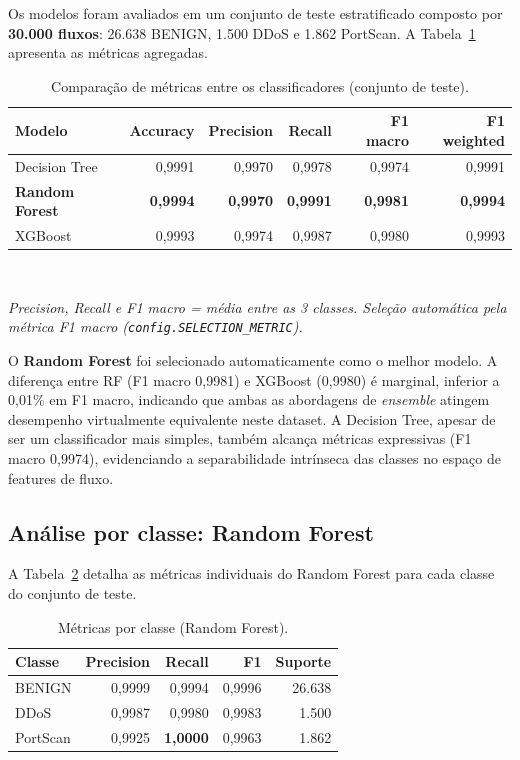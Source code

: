 \documentclass[12pt,a4paper]{article}
\begin{document}
Os modelos foram avaliados em um conjunto de teste estratificado composto
por \textbf{30.000 fluxos}: 26.638 BENIGN, 1.500 DDoS e 1.862 PortScan.
A Tabela~\ref{tab:metricas} apresenta as métricas agregadas.

\begin{table}[ht]
  \centering
  \caption{Comparação de métricas entre os classificadores (conjunto de teste).}
  \label{tab:metricas}
  \begin{tabular}{@{}lrrrrr@{}}
    \toprule
    \textbf{Modelo}
      & \textbf{Accuracy}
      & \textbf{Precision}
      & \textbf{Recall}
      & \textbf{F1 macro}
      & \textbf{F1 weighted} \\
    \midrule
    Decision Tree  & 0{,}9991 & 0{,}9970 & 0{,}9978 & 0{,}9974 & 0{,}9991 \\
    \textbf{Random Forest}
                   & \textbf{0{,}9994} & \textbf{0{,}9970} & \textbf{0{,}9991}
                   & \textbf{0{,}9981} & \textbf{0{,}9994} \\
    XGBoost        & 0{,}9993 & 0{,}9974 & 0{,}9987 & 0{,}9980 & 0{,}9993 \\
    \bottomrule
  \end{tabular}
  \small\medskip\\
  \raggedright
  \textit{Precision, Recall e F1 macro = média entre as 3 classes.
  Seleção automática pela métrica F1 macro (\texttt{config.SELECTION\_METRIC}).}
\end{table}

O \textbf{Random Forest} foi selecionado automaticamente como o melhor modelo.
A diferença entre RF (F1 macro 0{,}9981) e XGBoost (0{,}9980) é marginal,
inferior a 0{,}01\% em F1 macro, indicando que ambas as abordagens de
\emph{ensemble} atingem desempenho virtualmente equivalente neste dataset.
A Decision Tree, apesar de ser um classificador mais simples, também alcança
métricas expressivas (F1 macro 0{,}9974), evidenciando a separabilidade
intrínseca das classes no espaço de features de fluxo.

\subsection{Análise por classe: Random Forest}

A Tabela~\ref{tab:por_classe} detalha as métricas individuais do Random Forest
para cada classe do conjunto de teste.

\begin{table}[ht]
  \centering
  \caption{Métricas por classe (Random Forest).}
  \label{tab:por_classe}
  \begin{tabular}{@{}lrrrr@{}}
    \toprule
    \textbf{Classe}
      & \textbf{Precision}
      & \textbf{Recall}
      & \textbf{F1}
      & \textbf{Suporte} \\
    \midrule
    BENIGN    & 0{,}9999 & 0{,}9994 & 0{,}9996 & 26.638 \\
    DDoS      & 0{,}9987 & 0{,}9980 & 0{,}9983 &  1.500 \\
    PortScan  & 0{,}9925 & \textbf{1{,}0000} & 0{,}9963 &  1.862 \\
    \bottomrule
  \end{tabular}
\end{table}
\end{document}
